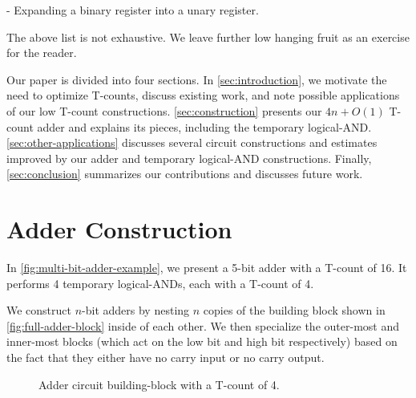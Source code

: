 \documentclass{quantumarticle-customized}
\begin{document}
- Expanding a binary register into a unary register.

The above list is not exhaustive.
We leave further low hanging fruit as an exercise for the reader.

Our paper is divided into four sections.
In \autoref{sec:introduction}, we motivate the need to optimize T-counts, discuss existing work, and note possible applications of our low T-count constructions.
\autoref{sec:construction} presents our $4n + O(1)$ T-count adder and explains its pieces, including the temporary logical-AND.
\autoref{sec:other-applications} discusses several circuit constructions and estimates improved by our adder and temporary logical-AND constructions.
Finally, \autoref{sec:conclusion} summarizes our contributions and discusses future work.


\section{Adder Construction}
\label{sec:construction}

In \autoref{fig:multi-bit-adder-example}, we present a 5-bit adder with a T-count of 16.
It performs 4 temporary logical-ANDs, each with a T-count of 4.

We construct $n$-bit adders by nesting $n$ copies of the building block shown in \autoref{fig:full-adder-block} inside of each other.
We then specialize the outer-most and inner-most blocks (which act on the low bit and high bit respectively) based on the fact that they either have no carry input or no carry output.

\begin{figure}
  \caption{
	Adder circuit building-block with a T-count of 4.
  }
  \label{fig:full-adder-block}
\end{figure}
\end{document}
